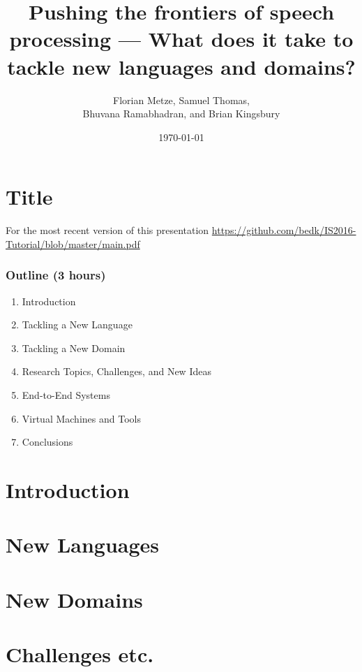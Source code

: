 \documentclass[12pt,xcolor=dvipsnames]{beamer}
\author{Florian Metze, Samuel Thomas, \\
  Bhuvana Ramabhadran, and Brian Kingsbury}
\title{{\color{Maroon} Pushing the frontiers of speech processing --- What does it take to tackle new languages and domains?}}
\institute{Carnegie Mellon University and IBM}
\date{\today}
\begin{document}
\section{Title}

\begin{frame}
  \titlepage
\end{frame}

\begin{frame}{For the most recent version of this presentation}{}
  \url{https://github.com/bedk/IS2016-Tutorial/blob/master/main.pdf}
\end{frame}



\begin{frame}
  \frametitle{Outline (3 hours)}
  \begin{enumerate}
  \item Introduction
  \item Tackling a New Language
  \item Tackling a New Domain
  \item Research Topics, Challenges, and New Ideas
  \item End-to-End Systems
  \item Virtual Machines and Tools
  \item Conclusions
  \end{enumerate}
\end{frame}

\section{Introduction}


\section{New Languages}


\section{New Domains}


\section{Challenges etc.}

\end{document}

